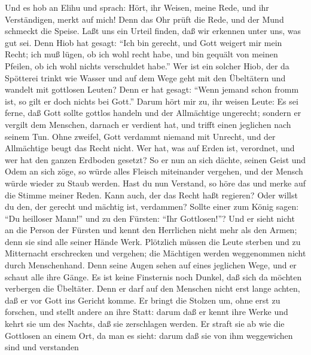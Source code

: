  Und es hob an Elihu und sprach:  Hört, ihr
Weisen, meine Rede, und ihr Verständigen, merkt auf mich! 
Denn das Ohr prüft die Rede, und der Mund schmeckt die Speise.
 Laßt uns ein Urteil finden, daß wir erkennen unter uns, was
gut sei.  Denn Hiob hat gesagt: ``Ich bin gerecht, und Gott
weigert mir mein Recht;  ich muß lügen, ob ich wohl recht
habe, und bin gequält von meinen Pfeilen, ob ich wohl nichts verschuldet
habe.''  Wer ist ein solcher Hiob, der da Spötterei trinkt
wie Wasser  und auf dem Wege geht mit den Übeltätern und
wandelt mit gottlosen Leuten?  Denn er hat gesagt: ``Wenn
jemand schon fromm ist, so gilt er doch nichts bei Gott.'' 
Darum hört mir zu, ihr weisen Leute: Es sei ferne, daß Gott sollte
gottlos handeln und der Allmächtige ungerecht;  sondern er
vergilt dem Menschen, darnach er verdient hat, und trifft einen
jeglichen nach seinem Tun.  Ohne zweifel, Gott verdammt
niemand mit Unrecht, und der Allmächtige beugt das Recht nicht.
 Wer hat, was auf Erden ist, verordnet, und wer hat den
ganzen Erdboden gesetzt?  So er nun an sich dächte, seinen
Geist und Odem an sich zöge,  so würde alles Fleisch
miteinander vergehen, und der Mensch würde wieder zu Staub werden.
 Hast du nun Verstand, so höre das und merke auf die Stimme
meiner Reden.  Kann auch, der das Recht haßt regieren? Oder
willst du den, der gerecht und mächtig ist, verdammen? 
Sollte einer zum König sagen: ``Du heilloser Mann!'' und zu den Fürsten:
``Ihr Gottlosen!''?  Und er sieht nicht an die Person der
Fürsten und kennt den Herrlichen nicht mehr als den Armen; denn sie sind
alle seiner Hände Werk.  Plötzlich müssen die Leute sterben
und zu Mitternacht erschrecken und vergehen; die Mächtigen werden
weggenommen nicht durch Menschenhand.  Denn seine Augen
sehen auf eines jeglichen Wege, und er schaut alle ihre Gänge.
 Es ist keine Finsternis noch Dunkel, daß sich da möchten
verbergen die Übeltäter.  Denn er darf auf den Menschen
nicht erst lange achten, daß er vor Gott ins Gericht komme.
 Er bringt die Stolzen um, ohne erst zu forschen, und
stellt andere an ihre Statt:  darum daß er kennt ihre Werke
und kehrt sie um des Nachts, daß sie zerschlagen werden. 
Er straft sie ab wie die Gottlosen an einem Ort, da man es sieht:
 darum daß sie von ihm weggewichen sind und verstanden
